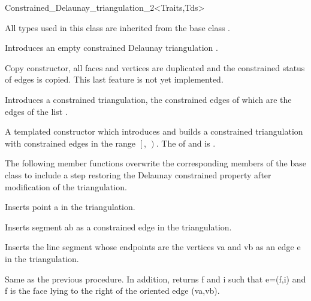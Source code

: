 \begin{ccRefClass}{Constrained_Delaunay_triangulation_2<Traits,Tds>}

\ccInheritsFrom {}

\ccTypes
All types used in this class are inherited from the base class
.



\ccCreation
{}  %

{Introduces an empty constrained Delaunay triangulation \ccVar.}

 {Copy constructor, all faces and vertices
are duplicated and  the constrained status of edges
is copied. This last feature is not yet implemented.}

{Introduces a constrained triangulation, the constrained edges of which
are the edges of the list .}


{A templated constructor which introduces and builds
 a constrained triangulation with constrained edges in the range 
$\left[\right.$, $\left.\right)$.
\ccPrecond The  of  and 
 is .}


The following member functions overwrite the corresponding
members of the base class to include a step restoring
 the Delaunay constrained
property after modification of the triangulation.

{ Inserts point a in the triangulation. }

{ Inserts segment ab as a constrained edge in the triangulation. }

{ Inserts the line segment whose endpoints are the vertices va and vb
as an edge e in the triangulation. }

{Same as the previous procedure. In addition, returns f and i such that
e=(f,i) and f is the face lying to the right of the oriented edge (va,vb). }



\end{ccRefClass}
